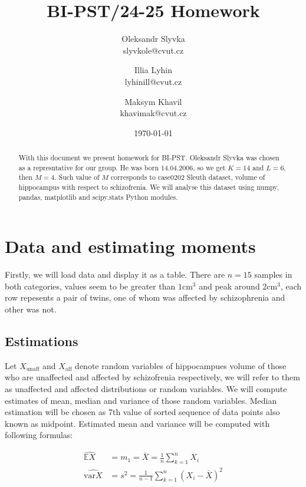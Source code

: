 \documentclass[12pt,a4paper]{article} %
\title{BI-PST/24-25 Homework}
\author{Oleksandr Slyvka\\ slyvkole@cvut.cz  \and Illia Lyhin  \\ lyhinill@cvut.cz \and Maksym Khavil \\ khavimak@cvut.cz }
\date{\today} %
\newcommand{\randv}[2][X]{#1_{\text{#2}}}
\newcommand{\E}{\mathbb{E}}
\newcommand{\var}{\text{var}}
\begin{document}
\maketitle
\begin{abstract}
With this document we present homework for BI-PST. Oleksandr Slyvka was chosen as a represntative for our group. He was born 14.04.2006, so we get $K=14$ and $L=6$, then $M = 4$. Such value of $M$ corresponds to case0202 Sleuth dataset, volume of hippocampus with respect to schizofrenia. We will analyse this dataset using numpy, pandas, matplotlib and scipy.stats Python modules.
\end{abstract}
\vspace{1em}

\section{Data and estimating moments}

\begin{multicols}{2}

  Firstly, we will load data and display it as a table. There are $n=15$ samples in both categories, values seem to be greater than $1 \text{cm}^3$ and peak around $2 \text{cm}^3$, each row repesents a pair of twins, one of whom was affected by schizophrenia and other was not.
\columnbreak

\datatable


\end{multicols}
\pagebreak

\subsection{Estimations}
  Let $\randv{unaff}$ and $\randv{aff}$ denote random variables of hippocampues volume of those who are unaffected and affected by schizofrenia respectively, we will refer to them as unaffected and affected distributions or random variables. We will compute estimates of mean, median and variance of those random variables. Median estimation will be chosen as 7th value of sorted sequence of data points also known as midpoint. Estimated mean and variance will be computed with following formulas:

\begin{align*}
  \widehat{\E\randv{}} &= m_1 = \bar{X} = \frac{1}{n} \sum_{k = 1}^{n}X_i\\
  \widehat{\var\randv{}} &= s^2 = \frac{1}{n - 1} \sum_{k = 1}^n(X_i - \bar{X})^2
\end{align*}
\end{document}
